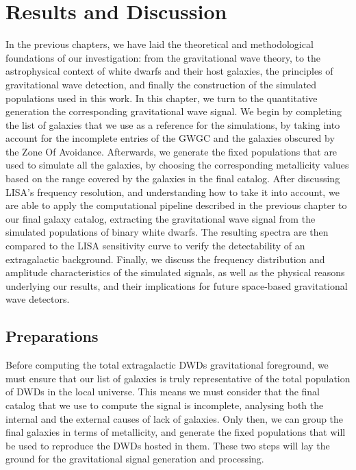 \chapter{Results and Discussion}
In the previous chapters, we have laid the theoretical and methodological foundations of our investigation:  
from the gravitational wave theory, to the astrophysical context of white dwarfs and their host galaxies, the principles of gravitational wave detection, and finally the construction of the simulated populations used in this work.  
In this chapter, we turn to the quantitative generation the corresponding gravitational wave signal.  
We begin by completing the list of galaxies that we use as a reference for the simulations, by taking into account for the incomplete entries of the GWGC and the galaxies obscured by the Zone Of Avoidance.
Afterwards, we generate the fixed populations that are used to simulate all the galaxies, by choosing the corresponding metallicity values based on the range covered by the galaxies in the final catalog.
After discussing LISA's frequency resolution, and understanding how to take it into account, we are able to apply the computational pipeline described in the previous chapter to our final galaxy catalog, extracting the gravitational wave signal from the simulated populations of binary white dwarfs.  
The resulting spectra are then compared to the LISA sensitivity curve to verify the detectability of an extragalactic background.  
Finally, we discuss the frequency distribution and amplitude characteristics of the simulated signals, as well as the physical reasons underlying our results, and their implications for future space-based gravitational wave detectors.


\section{Preparations}
Before computing the total extragalactic DWDs gravitational foreground, we must ensure that our list of galaxies is truly representative of the total population of DWDs in the local universe. 
This means we must consider that the final catalog that we use to compute the signal is incomplete, analysing both the internal and the external causes of lack of galaxies.
Only then, we can group the final galaxies in terms of metallicity, and generate the fixed populations that will be used to reproduce the DWDs hosted in them.
These two steps will lay the ground for the gravitational signal generation and processing.

